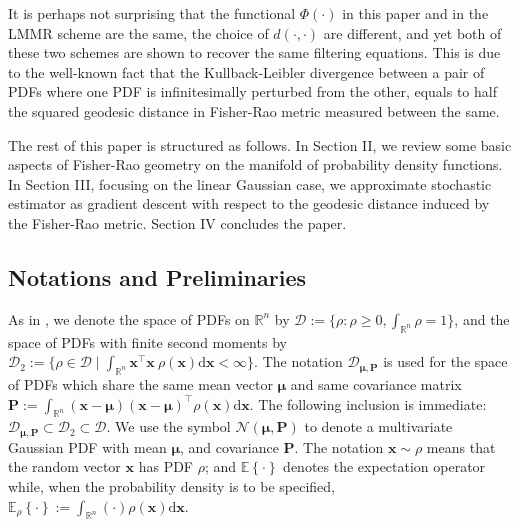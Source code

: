 \documentclass[letterpaper,10pt,twocolumn,conference]{ieeeconf}
\newcommand{\mR}{{\mathbb R}}
\newcommand{\cD}{{\mathscr{D}}}
\newcommand{\bbx}{{\bm{x}}}
\newcommand{\bmu}{\bm{\mu}}
\newcommand{\bbP}{{\bm{P}}}
\begin{document}
It is perhaps not surprising that the functional $\Phi(\cdot)$ in this paper and in the LMMR scheme \cite{LaugesenMehta2015} are the same, the choice of $d(\cdot,\cdot)$ are different, and yet both of these two schemes are shown to recover the same filtering equations. This is due to the well-known fact \cite[Ch. 2, p. 26--28]{Kullback1968} that the Kullback-Leibler divergence between a pair of PDFs where one PDF is infinitesimally perturbed from the other, equals to half the squared geodesic distance in Fisher-Rao metric measured between the same.


The rest of this paper is structured as follows. In Section II, we review some basic aspects of Fisher-Rao geometry on the manifold of probability density functions. In Section III, focusing on the linear Gaussian case, we approximate stochastic estimator as gradient descent with respect to the geodesic distance induced by the Fisher-Rao metric. Section IV concludes the paper.

\subsection*{Notations and Preliminaries}
As in \cite{HalderGeorgiouCDC2017}, we denote the space of PDFs on $\mR^n$ by $\cD := \{\rho: \rho \geq 0, \int_{\mR^n} \rho = 1\}$, and the space of PDFs with finite second moments by $\cD_2:=\{\rho\in\cD \mid \int_{\mR^n} \bm{x}^{\top}\bm{x}\:\rho(\bm{x})\mathrm{d}\bm{x} < \infty\}$. The notation $\cD_{\bm{\mu},\bm{P}}$ is used for the space of PDFs which share the same mean vector $\bm{\mu}$ and same covariance matrix $\bbP:=\int_{\mR^n}(\bbx-\bm{\mu})(\bbx-\bm{\mu})^\top \rho(\bbx)\mathrm{d}\bbx$. The following inclusion is immediate: $\cD_{\bm{\mu},\bm{P}} \subset \cD_{2} \subset \cD$. We use the symbol $\mathcal{N}\left(\bmu,\bbP\right)$ to denote a multivariate Gaussian PDF with mean $\bmu$, and covariance $\bm{P}$. The notation $\bbx\sim\rho$ means that the random vector $\bbx$ has PDF $\rho$; and $\mathbb{E}\left\{\cdot\right\}$ denotes the expectation operator while, when the probability density is to be specified, $\mathbb{E}_\rho\left\{\cdot\right\}:=\int_{\mR^n}(\cdot)\rho(\bbx)\mathrm{d}\bbx$.
\end{document}
